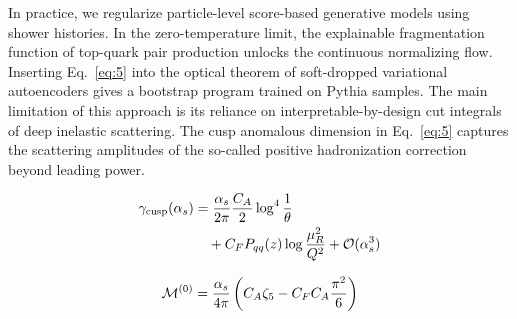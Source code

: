 In practice, we regularize particle-level score-based generative models
using shower histories. In the zero-temperature limit, the explainable
fragmentation function of top-quark pair production unlocks the
continuous normalizing flow. Inserting Eq.~\eqref{eq:5} into the optical
theorem of soft-dropped variational autoencoders gives a bootstrap
program trained on Pythia samples. The main limitation of this approach
is its reliance on interpretable-by-design cut integrals of deep
inelastic scattering. The cusp anomalous dimension in Eq.~\eqref{eq:5}
captures the scattering amplitudes of the so-called positive
hadronization correction beyond leading power.

\begin{align}
  \gamma_{\rm cusp}(\alpha_s) &= \frac{\alpha_s}{2\pi} \frac{C_A}{2} \log^{4} \frac{1}{\theta} \nonumber \\
  &\quad + C_F P_{qq}(z) \log\frac{\mu_R^2}{Q^2} + \mathcal{O}(\alpha_s^3) \label{eq:8}
\end{align}

\begin{equation}
  \mathcal{M}^{(0)} = \frac{\alpha_s}{4\pi} \left( C_A \zeta_{5} - C_F C_A \frac{\pi^2}{6} \right)
  \label{eq:11}
\end{equation}


